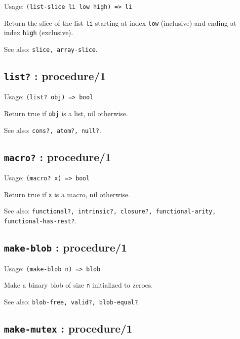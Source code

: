 \documentclass[
]{article}
\newcommand{\passthrough}[1]{#1}
\begin{document}
Usage: \passthrough{\lstinline!(list-slice li low high) => li!}

Return the slice of the list \passthrough{\lstinline!li!} starting at
index \passthrough{\lstinline!low!} (inclusive) and ending at index
\passthrough{\lstinline!high!} (exclusive).

See also: \passthrough{\lstinline!slice, array-slice!}.

\hypertarget{list-procedure1-1}{%
\subsection{\texorpdfstring{\texttt{list?} :
procedure/1}{list? : procedure/1}}\label{list-procedure1-1}}

Usage: \passthrough{\lstinline!(list? obj) => bool!}

Return true if \passthrough{\lstinline!obj!} is a list, nil otherwise.

See also: \passthrough{\lstinline!cons?, atom?, null?!}.

\hypertarget{macro-procedure1-1}{%
\subsection{\texorpdfstring{\texttt{macro?} :
procedure/1}{macro? : procedure/1}}\label{macro-procedure1-1}}

Usage: \passthrough{\lstinline!(macro? x) => bool!}

Return true if \passthrough{\lstinline!x!} is a macro, nil otherwise.

See also:
\passthrough{\lstinline!functional?, intrinsic?, closure?, functional-arity, functional-has-rest?!}.

\hypertarget{make-blob-procedure1-1}{%
\subsection{\texorpdfstring{\texttt{make-blob} :
procedure/1}{make-blob : procedure/1}}\label{make-blob-procedure1-1}}

Usage: \passthrough{\lstinline!(make-blob n) => blob!}

Make a binary blob of size \passthrough{\lstinline!n!} initialized to
zeroes.

See also: \passthrough{\lstinline!blob-free, valid?, blob-equal?!}.

\hypertarget{make-mutex-procedure1-1}{%
\subsection{\texorpdfstring{\texttt{make-mutex} :
procedure/1}{make-mutex : procedure/1}}\label{make-mutex-procedure1-1}}
\end{document}
